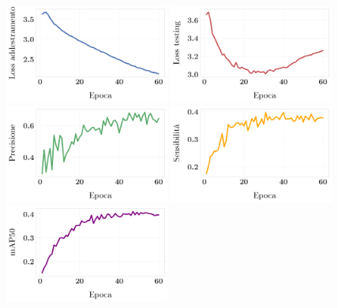\documentclass[12pt]{report}
\begin{document}
\begin{figure}[h!]
	\centering
	{\includegraphics[width=0.48\textwidth]{images/domain-shift/real-to-real/3/train-loss}}
	\hspace{0.01\textwidth}
	{\includegraphics[width=0.48\textwidth]{images/domain-shift/real-to-real/3/testing-loss}}
	\hspace{0.01\textwidth}
	\\	
	{\includegraphics[width=0.48\textwidth]{images/domain-shift/real-to-real/3/precision}}
	\hspace{0.01\textwidth}
	{\includegraphics[width=0.48\textwidth]{images/domain-shift/real-to-real/3/recall}}
	\hspace{0.01\textwidth}
	\\
	{\includegraphics[width=0.48\textwidth]{images/domain-shift/real-to-real/3/map50}}

\end{figure}
\end{document}
